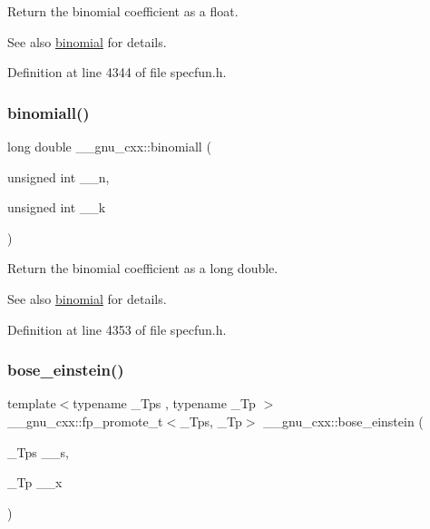 Return the binomial coefficient as a {\ttfamily float}.

\begin{DoxySeeAlso}{See also}
\hyperlink{group__gnu__math__spec__func_gabd0cf6e3f1e1d36c4c45f118e34a5ca2}{binomial} for details. 
\end{DoxySeeAlso}


Definition at line 4344 of file specfun.\+h.

\mbox{\label{group__gnu__math__spec__func_ga57602195f9215f735793c11d3210ac93}} 
\subsubsection{\texorpdfstring{binomiall()}{binomiall()}}
{\footnotesize\ttfamily long double \+\_\+\+\_\+gnu\+\_\+cxx\+::binomiall (\begin{DoxyParamCaption}\item[{unsigned int}]{\+\_\+\+\_\+n,  }\item[{unsigned int}]{\+\_\+\+\_\+k }\end{DoxyParamCaption})\hspace{0.3cm}{\ttfamily [inline]}}

Return the binomial coefficient as a {\ttfamily long double}.

\begin{DoxySeeAlso}{See also}
\hyperlink{group__gnu__math__spec__func_gabd0cf6e3f1e1d36c4c45f118e34a5ca2}{binomial} for details. 
\end{DoxySeeAlso}


Definition at line 4353 of file specfun.\+h.

\mbox{\label{group__gnu__math__spec__func_gae8135b6861a48f2cee2e692093a17102}} 
\subsubsection{\texorpdfstring{bose\+\_\+einstein()}{bose\_einstein()}}
{\footnotesize\ttfamily template$<$typename \+\_\+\+Tps , typename \+\_\+\+Tp $>$ \\
\+\_\+\+\_\+gnu\+\_\+cxx\+::fp\+\_\+promote\+\_\+t$<$\+\_\+\+Tps, \+\_\+\+Tp$>$ \+\_\+\+\_\+gnu\+\_\+cxx\+::bose\+\_\+einstein (\begin{DoxyParamCaption}\item[{\+\_\+\+Tps}]{\+\_\+\+\_\+s,  }\item[{\+\_\+\+Tp}]{\+\_\+\+\_\+x }\end{DoxyParamCaption})\hspace{0.3cm}{\ttfamily [inline]}}

